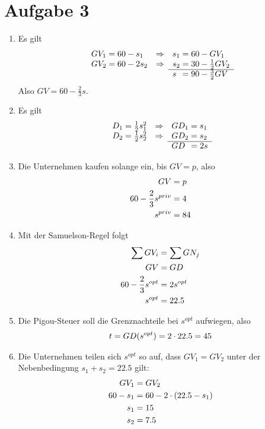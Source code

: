 \documentclass{article}
\begin{document}
	\section*{Aufgabe 3}
	\begin{enumerate}[label=(\alph*)]
		\item Es gilt
		\begin{align}
			\begin{array}{lcl}
				GV_1 = 60-s_1 & \Rightarrow & s_1 = 60-GV_1 \\
				GV_2 = 60-2s_2 & \Rightarrow & s_2 = 30 - \frac{1}{2}GV_2 \\
				\cline{3-3}
				&&s\;\, = 90 - \frac{3}{2}GV
			\end{array} \notag
		\end{align}
		Also $GV = 60 - \frac{2}{3}s$.
		\item Es gilt
		\begin{align}
			\begin{array}{lcl}
				D_1 = \frac{1}{2}s_1^2 & \Rightarrow & GD_1 = s_1 \\
				D_2 = \frac{1}{2}s_2^2 & \Rightarrow & GD_2 = s_2 \\
				\cline{3-3}
				&&GD\;\, = 2s
			\end{array} \notag
		\end{align}
		\item Die Unternehmen kaufen solange ein, bis $GV=p$, also
		\begin{align}
			GV &= p \notag \\
			60-\frac{2}{3}s^{priv} &= 4 \notag \\
			s^{priv} &= 84 \notag
		\end{align}
		\item Mit der Samuelson-Regel folgt
		\begin{align}
			\sum GV_i &= \sum GN_j \notag \\
			GV &= GD \notag \\
			60-\frac{2}{3}s^{opt} &= 2s^{opt} \notag \\
			s^{opt} &= 22.5 \notag
		\end{align}
		\item Die Pigou-Steuer soll die Grenznachteile bei $s^{opt}$ aufwiegen, also
		\begin{align}
			t = GD(s^{opt}) = 2\cdot 22.5 = 45 \notag
		\end{align}
		\item Die Unternehmen teilen sich $s^{opt}$ so auf, dass $GV_1=GV_2$ unter der Nebenbedingung $s_1+s_2=22.5$ gilt:
		\begin{align}
			GV_1 &= GV_2 \notag \\
			60-s_1 &= 60-2\cdot (22.5-s_1) \notag \\
			s_1 &= 15 \notag \\
			s_2 &= 7.5 \notag
		\end{align}
	\end{enumerate}
\end{document}
